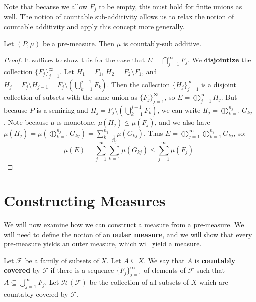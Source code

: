 	Note that because we allow $F_j$ to be empty, this must hold for finite unions as well. The notion of countable 
	sub-additivity allows us to relax the notion of countable additivity and apply this concept more generally. 
	
	\begin{theorem}
		Let $(P, \mu)$ be a pre-measure. Then $\mu$ is countably-sub additive. 
	\end{theorem}
	
	\begin{proof}
		It suffices to show this for the case that $E = \bigcap_{j = 1}^\infty F_j$. We \textbf{disjointize} the collection 
		$\{F_j\}_{j = 1}^\infty$. Let $H_1 = F_1$, $H_2 = F_2\setminus F_1$, and $H_j = F_j\setminus H_{j - 1} = F_j
		\setminus(\bigcup_{k = 1}^{j - 1} F_k)$. Then the collection $\{H_j\}_{j = 1}^\infty$ is a disjoint collection of subsets 
		with the same union as $\{F_j\}_{j = 1}^\infty$, so $E = \bigoplus_{j = 1}^\infty H_j$. But because $P$ is a semiring 
		and $H_j = F_j\setminus(\bigcup_{k = 1}^{j - 1} F_k)$, we can write $H_j = \bigoplus_{k = 1}^{n_j} G_{kj}$. Note 
		because $\mu$ is monotone, $\mu(H_j)\leq \mu(F_j)$, and we also have $\mu(H_j) = \mu(\bigoplus_{k = 1}^{n_j} 
		G_{kj}) = \sum_{k = 1}^{n_j}\mu(G_{kj})$. Thus $E = \bigoplus_{j = 1}^\infty\bigoplus_{k = 1}^{n_j} G_{kj}$, so:
		$$
			\mu(E) = \sum_{j = 1}^\infty\sum_{k = 1}^{n_j}\mu(G_{kj})\leq\sum_{j = 1}^\infty\mu(F_j)
		$$
	\end{proof}
	
\section{Constructing Measures}

	We will now examine how we can construct a measure from a pre-measure. We will need to define the notion of an 
	\textbf{outer measure}, and we will show that every pre-measure yields an outer measure, which will yield a measure. 
	
	\begin{definition}
		Let $\mathcal F$ be a family of subsets of $X$. Let $A\subseteq X$. We say that $A$ is \textbf{countably covered} 
		by $\mathcal F$ if there is a sequence $\{F_j\}_{j = 1}^\infty$ of elements of $\mathcal F$ such that $A\subseteq
		\bigcup_{j = 1}^\infty F_j$. Let $\mathcal H(\mathcal F)$ be the collection of all subsets of $X$ which are countably 
		covered by $\mathcal F$. 
	\end{definition}
	
